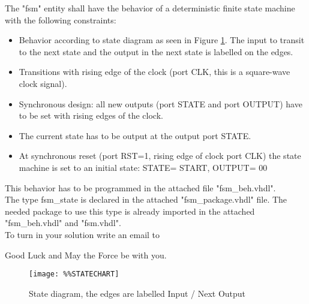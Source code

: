 \documentclass[a4paper,12pt]{article}
\begin{document}
The "fsm" entity shall have the behavior of a deterministic finite state machine with the following constraints:
\begin{itemize}
\item Behavior according to state diagram as seen in Figure \ref{state_image}. The input to transit to the next state and the output in the next state is labelled on the edges.
\item Transitions with rising edge of the clock (port CLK, this is a square-wave clock signal).
\item Synchronous design: all new outputs (port STATE and port OUTPUT) have to be set with rising edges of the clock.
\item The current state has to be output at the output port STATE.
\item At synchronous reset (port RST=1, rising edge of clock port CLK) the state machine is set to an initial state: STATE= START, OUTPUT= 00
\end{itemize}
\vspace{0.2cm}

This behavior has to be programmed in the attached file "fsm\_beh.vhdl".
\\

The type fsm\_state is declared in the attached "fsm\_package.vhdl" file. The needed package to use this type is already imported in the attached "fsm\_beh.vhdl" and "fsm.vhdl". 
\\


To turn in your solution write an email to %

\vspace{0.7cm}

Good Luck and May the Force be with you.

\newpage

\begin{figure}[ht]
	\centering
  \texttt{[image: \%\%STATECHART]}
	\caption{State diagram, the edges are labelled Input / Next Output}
	\label{state_image}
\end{figure}
\end{document}
